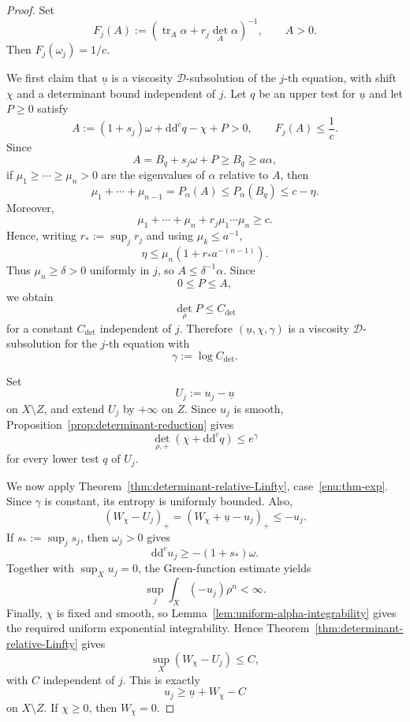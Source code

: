 \documentclass[10pt,a4paper]{amsart}
\renewcommand{\d}{\mathrm{d}}
\newcommand{\ddc}{\d\d^c}
\def\tr{\operatorname{tr}}
\begin{document}
\begin{proof}
Set
$$
F_j(A):=
\left(\tr_A\alpha+r_j\det_A\alpha\right)^{-1},
\qquad A>0.
$$
Then $F_j(\omega_j)=1/c$.

We first claim that $\underline u$ is a viscosity $\mathcal D$-subsolution of the
$j$-th equation, with shift $\chi$ and a determinant bound independent
of $j$. Let $q$ be an upper test for $\underline u$ and let $P\geq 0$
satisfy
$$
A:=(1+s_j)\omega+\ddc q-\chi+P>0,
\qquad
F_j(A)\leq \frac1c.
$$
Since
$$
A=B_q+s_j\omega+P\geq B_q\geq a\alpha,
$$
if $\mu_1\geq\cdots\geq\mu_n>0$ are the eigenvalues of $\alpha$
relative to $A$, then
$$
\mu_1+\cdots+\mu_{n-1}
=
P_\alpha(A)
\leq
P_\alpha(B_q)
\leq c-\eta.
$$
Moreover,
$$
\mu_1+\cdots+\mu_n+r_j\mu_1\cdots\mu_n\geq c.
$$
Hence, writing $r_*:=\sup_j r_j$ and using $\mu_k\leq a^{-1}$,
$$
\eta
\leq
\mu_n\left(1+r_*a^{-(n-1)}\right).
$$
Thus $\mu_n\geq\delta>0$ uniformly in $j$, so $A\leq\delta^{-1}\alpha$.
Since
$$
0\leq P\leq A,
$$
we obtain
$$
\det_\rho P\leq C_{\det}
$$
for a constant $C_{\det}$ independent of $j$. Therefore
$(\underline u,\chi,\gamma)$ is a viscosity $\mathcal D$-subsolution for the
$j$-th equation with
$$
\gamma:=\log C_{\det}.
$$

Set
$$
U_j:=u_j-\underline u
$$
on $X\setminus Z$, and extend $U_j$ by $+\infty$ on $Z$.
Since $u_j$ is smooth, Proposition~\ref{prop:determinant-reduction} gives
$$
\det_{\rho,+}(\chi+\ddc q)\leq e^\gamma
$$
for every lower test $q$ of $U_j$.

We now apply Theorem~\ref{thm:determinant-relative-Linfty}, case~\ref{enu:thm-exp}. Since $\gamma$ is constant,
its entropy is uniformly bounded. Also,
$$
(W_\chi-U_j)_+
=
(W_\chi+\underline u-u_j)_+
\leq -u_j.
$$
If $s_*:=\sup_j s_j$, then $\omega_j>0$ gives
$$
\ddc u_j\geq -(1+s_*)\omega.
$$
Together with $\sup_Xu_j=0$, the Green-function estimate yields
$$
\sup_j\int_X(-u_j)\rho^n<\infty.
$$
Finally, $\chi$ is fixed and smooth, so Lemma~\ref{lem:uniform-alpha-integrability} gives the required
uniform exponential integrability. Hence Theorem~\ref{thm:determinant-relative-Linfty} gives
$$
\sup_X(W_\chi-U_j)\leq C,
$$
with $C$ independent of $j$. This is exactly
$$
u_j\geq \underline u+W_\chi-C
$$
on $X\setminus Z$. If $\chi\geq 0$, then $W_\chi=0$.
\end{proof}
\end{document}
